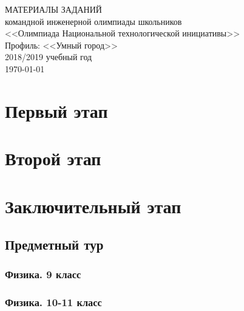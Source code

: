 \documentclass[a4paper,12pt,oneside]{book}
\begin{document}
\begin{titlepage}
    \begin{center}
        \huge{МАТЕРИАЛЫ ЗАДАНИЙ} \\
        \Large{командной инженерной олимпиады школьников} \\
        \Large{<<Олимпиада Национальной технологической инициативы>>} \\
        \Large{Профиль: <<Умный город>>} \\
        \large{2018/2019 учебный год} \\
        \vspace{2cm}
        \Large{\today}  
    \end{center}
\end{titlepage}

\setcounter{tocdepth}{1}

\tableofcontents

\part{Первый этап}




\part{Второй этап}
\clearpage



\part{Заключительный этап}

\clearpage
\chapter{Предметный тур}

\section{Физика. 9 класс}


\section{Физика. 10-11 класс}


%
%
\end{document}

